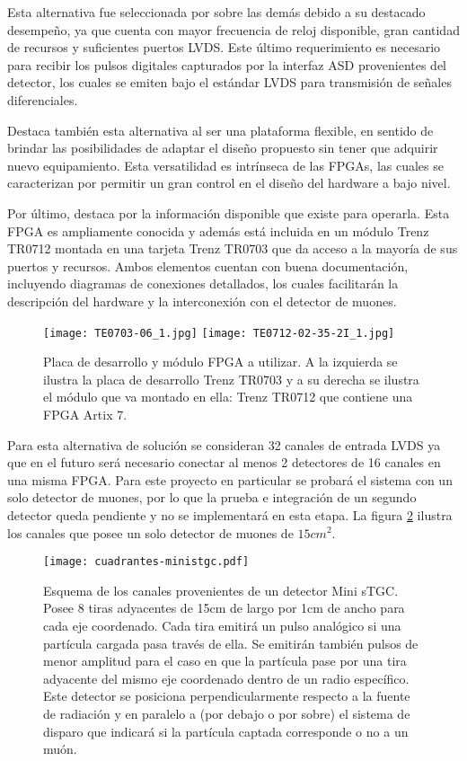 Esta alternativa fue seleccionada por sobre las demás debido a su destacado desempeño, ya que cuenta con mayor frecuencia de reloj disponible, gran cantidad de recursos y suficientes puertos LVDS. Este último requerimiento es necesario para recibir los pulsos digitales capturados por la interfaz ASD\cite{1999ATLASICs} provenientes del detector, los cuales se emiten bajo el estándar LVDS para transmisión de señales diferenciales.

Destaca también esta alternativa al ser una plataforma flexible, en sentido de brindar las posibilidades de adaptar el diseño propuesto sin tener que adquirir nuevo equipamiento. Esta versatilidad es intrínseca de las FPGAs, las cuales se caracterizan por permitir un gran control en el diseño del hardware a bajo nivel.

Por último, destaca por la información disponible que existe para operarla. Esta FPGA es ampliamente conocida y además está incluida en un módulo Trenz TR0712\cite{TrenzElectronic2019TR07012Wiki} montada en una tarjeta Trenz TR0703\cite{TrenzElectronic2019TR0703Wiki} que da acceso a la mayoría de sus puertos y recursos. Ambos elementos cuentan con buena documentación, incluyendo diagramas de conexiones detallados, los cuales facilitarán la descripción del hardware y la interconexión con el detector de muones.

\begin{figure}[H]
	\centering
	\texttt{[image: TE0703-06\_1.jpg]}
	\texttt{[image: TE0712-02-35-2I\_1.jpg]}
	\caption{Placa de desarrollo y módulo FPGA a utilizar. A la izquierda se ilustra la placa de desarrollo Trenz TR0703\cite{TrenzElectronic2019TR0703Wiki} y a su derecha se ilustra el módulo que va montado en ella: Trenz TR0712\cite{TrenzElectronic2019TR07012Wiki} que contiene una FPGA Artix 7\cite{Xilinx20107DS180}.}
	\label{fig:trenz}
\end{figure}


Para esta alternativa de solución se consideran 32 canales de entrada LVDS ya que en el futuro será necesario conectar al menos 2 detectores de 16 canales en una misma FPGA. Para este proyecto en particular se probará el sistema con un solo detector de muones, por lo que la prueba e integración de un segundo detector queda pendiente y no se implementará en esta etapa. La figura \ref{fig:ministgc} ilustra los canales que posee un solo detector de muones de $15cm^2$.

\begin{figure}[H]
	\centering
	\texttt{[image: cuadrantes-ministgc.pdf]}
	\caption{Esquema de los canales provenientes de un detector Mini sTGC. Posee 8 tiras adyacentes de 15cm de largo por 1cm de ancho para cada eje coordenado. Cada tira emitirá un pulso analógico si una partícula cargada pasa través de ella. Se emitirán también pulsos de menor amplitud para el caso en que la partícula pase por una tira adyacente del mismo eje coordenado dentro de un radio específico. Este detector se posiciona perpendicularmente respecto a la fuente de radiación y en paralelo a (por debajo o por sobre) el sistema de disparo que indicará si la partícula captada corresponde o no a un muón. }
	\label{fig:ministgc}
\end{figure}

